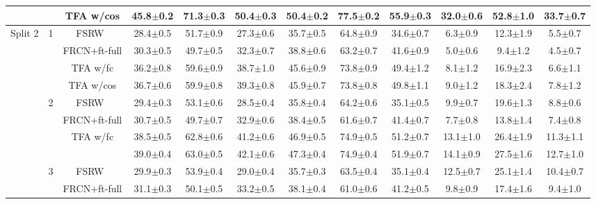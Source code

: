 \documentclass{article}
\newcommand{\model}{TFA\xspace}
\begin{document}
\begin{table*}[!h]
{\begin{tabular}{c|c|c|ccc|ccc|ccc}
    & &\cellcolor{Gray} {\model w/cos} & \cellcolor{Gray}45.8$\pm$0.2 & \cellcolor{Gray}71.3$\pm$0.3 & \cellcolor{Gray}50.4$\pm$0.3 &\cellcolor{Gray} 50.4$\pm$0.2 & \cellcolor{Gray}77.5$\pm$0.2 &\cellcolor{Gray} 55.9$\pm$0.3 & \cellcolor{Gray}32.0$\pm$0.6 & \cellcolor{Gray}52.8$\pm$1.0 & \cellcolor{Gray}33.7$\pm$0.7  \\ \midrule
\multirow{21}{*}{Split 2} & \multirow{4}{*}{1} & FSRW~\cite{kang2019few} &
    28.4$\pm$0.5&51.7$\pm$0.9&27.3$\pm$0.6&35.7$\pm$0.5&64.8$\pm$0.9&34.6$\pm$0.7&6.3$\pm$0.9&12.3$\pm$1.9&5.5$\pm$0.7 \\
    & & FRCN+ft-full & 30.3$\pm$0.5 & 49.7$\pm$0.5 & 32.3$\pm$0.7 & 38.8$\pm$0.6 & 63.2$\pm$0.7 & 41.6$\pm$0.9 & 5.0$\pm$0.6 & 9.4$\pm$1.2 & 4.5$\pm$0.7 \\
    & & {\model w/fc} & 36.2$\pm$0.8 & 59.6$\pm$0.9 & 38.7$\pm$1.0 & 45.6$\pm$0.9 & 73.8$\pm$0.9 & 49.4$\pm$1.2 & 8.1$\pm$1.2 & 16.9$\pm$2.3 & 6.6$\pm$1.1  \\
    & &\cellcolor{Gray} {\model w/cos} & \cellcolor{Gray}36.7$\pm$0.6 &\cellcolor{Gray} 59.9$\pm$0.8 &\cellcolor{Gray} 39.3$\pm$0.8 &\cellcolor{Gray} 45.9$\pm$0.7 & \cellcolor{Gray}73.8$\pm$0.8 &\cellcolor{Gray} 49.8$\pm$1.1 & \cellcolor{Gray}9.0$\pm$1.2 & \cellcolor{Gray}18.3$\pm$2.4 &\cellcolor{Gray} 7.8$\pm$1.2 \\ \cmidrule{2-12}
    & \multirow{4}{*}{2} & FSRW~\cite{kang2019few} & 
    29.4$\pm$0.3&53.1$\pm$0.6&28.5$\pm$0.4&35.8$\pm$0.4&64.2$\pm$0.6&35.1$\pm$0.5&9.9$\pm$0.7&19.6$\pm$1.3&8.8$\pm$0.6 \\
    & & FRCN+ft-full & 30.7$\pm$0.5 & 49.7$\pm$0.7 & 32.9$\pm$0.6 & 38.4$\pm$0.5 & 61.6$\pm$0.7 & 41.4$\pm$0.7 & 7.7$\pm$0.8 & 13.8$\pm$1.4 & 7.4$\pm$0.8 \\
    & &{\model w/fc} & 38.5$\pm$0.5 & 62.8$\pm$0.6 & 41.2$\pm$0.6 & 46.9$\pm$0.5 & 74.9$\pm$0.5 & 51.2$\pm$0.7 & 13.1$\pm$1.0 & 26.4$\pm$1.9 & 11.3$\pm$1.1  \\
    & & \cellcolor{Gray}{\model w/cos} & \cellcolor{Gray}39.0$\pm$0.4 & \cellcolor{Gray}63.0$\pm$0.5 & \cellcolor{Gray}42.1$\pm$0.6 & \cellcolor{Gray}47.3$\pm$0.4 & \cellcolor{Gray}74.9$\pm$0.4 &\cellcolor{Gray} 51.9$\pm$0.7 &\cellcolor{Gray} 14.1$\pm$0.9 &\cellcolor{Gray} 27.5$\pm$1.6 &\cellcolor{Gray} 12.7$\pm$1.0  \\ \cmidrule{2-12}
    & \multirow{4}{*}{3} & FSRW~\cite{kang2019few} & 29.9$\pm$0.3&53.9$\pm$0.4&29.0$\pm$0.4&35.7$\pm$0.3&63.5$\pm$0.4&35.1$\pm$0.4&12.5$\pm$0.7&25.1$\pm$1.4&10.4$\pm$0.7 \\
    & & FRCN+ft-full & 31.1$\pm$0.3 & 50.1$\pm$0.5 & 33.2$\pm$0.5 & 38.1$\pm$0.4 & 61.0$\pm$0.6 & 41.2$\pm$0.5 & 9.8$\pm$0.9 & 17.4$\pm$1.6 & 9.4$\pm$1.0 \\

\end{tabular}}
\end{table*}
\end{document}
